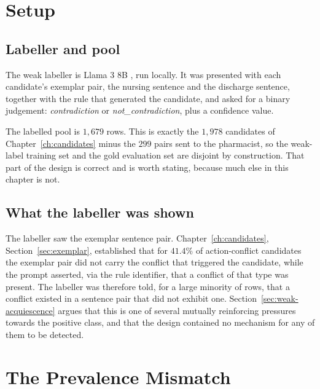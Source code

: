 \section{Setup}
\label{sec:weak-setup}

\subsection{Labeller and pool}

The weak labeller is Llama 3 8B \citep{grattafiori2024llama3}, run locally. It
was presented with each candidate's exemplar pair, the nursing sentence and the
discharge sentence, together with the rule that generated the candidate, and
asked for a binary judgement: \emph{contradiction} or \emph{not\_contradiction},
plus a confidence value.

The labelled pool is $1{,}679$ rows. This is exactly the $1{,}978$ candidates of
Chapter~\ref{ch:candidates} minus the $299$ pairs sent to the pharmacist, so the
weak-label training set and the gold evaluation set are disjoint by
construction. That part of the design is correct and is worth stating, because
much else in this chapter is not.

\subsection{What the labeller was shown}

The labeller saw the exemplar sentence pair. Chapter~\ref{ch:candidates},
Section~\ref{sec:exemplar}, established that for $41.4\%$ of action-conflict
candidates the exemplar pair did not carry the conflict that triggered the
candidate, while the prompt asserted, via the rule identifier, that a conflict
of that type was present. The labeller was therefore told, for a large minority
of rows, that a conflict existed in a sentence pair that did not exhibit one.
Section~\ref{sec:weak-acquiescence} argues that this is one of several mutually
reinforcing pressures towards the positive class, and that the design contained
no mechanism for any of them to be detected.

\section{The Prevalence Mismatch}
\label{sec:weak-prevalence}

